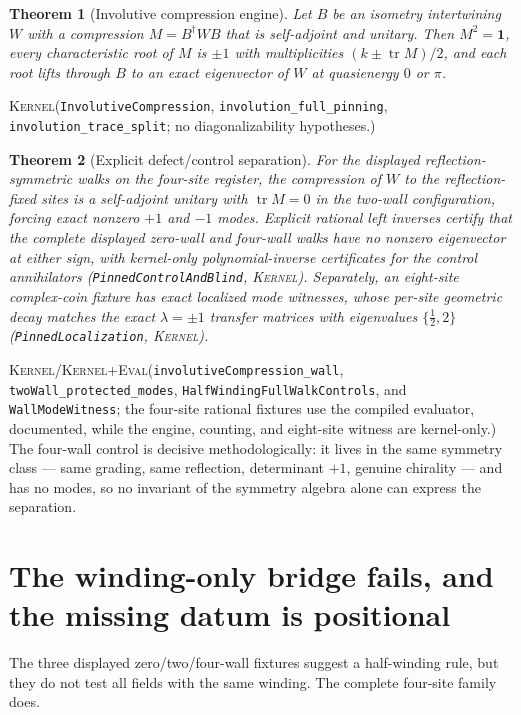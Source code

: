 \documentclass[11pt]{article}
\newcommand{\id}{\mathbf{1}}
\newcommand{\tr}{\operatorname{tr}}
\newcommand{\Kernel}{\textcolor{kernelcolor}{\textsc{Kernel}}}
\newcommand{\DraftTrust}{\textcolor{draftcolor}{\textsc{Kernel+Eval}}}
\newtheorem{theorem}{Theorem}
\begin{document}
\begin{theorem}[Involutive compression engine]\label{thm:engine}
Let $B$ be an isometry intertwining $W$ with a compression $M=B^\dagger WB$
that is self-adjoint and unitary.  Then $M^2=\id$, every characteristic
root of $M$ is $\pm1$ with multiplicities $(k\pm\tr M)/2$, and each root
lifts through $B$ to an exact eigenvector of $W$ at quasienergy $0$ or
$\pi$.
\end{theorem}
\noindent\Kernel{}\quad(\texttt{InvolutiveCompression},
\texttt{involution\_full\_pinning}, \texttt{involution\_trace\_split};
no diagonalizability hypotheses.)

\begin{theorem}[Explicit defect/control separation]\label{thm:halfwinding}
For the displayed reflection-symmetric walks on the four-site register, the
compression of $W$ to the reflection-fixed sites is a self-adjoint unitary
with $\tr M=0$ in the two-wall configuration, forcing exact nonzero $+1$
and $-1$ modes.  Explicit rational left inverses certify that the complete
displayed zero-wall and four-wall walks have no nonzero eigenvector at either
sign, with kernel-only polynomial-inverse certificates for the control
annihilators (\texttt{PinnedControlAndBlind}, \Kernel{}).  Separately, an
eight-site complex-coin fixture has exact localized
mode witnesses, whose per-site geometric decay matches the exact
$\lambda=\pm1$ transfer matrices with eigenvalues $\{\tfrac12,2\}$
(\texttt{PinnedLocalization}, \Kernel{}).
\end{theorem}
\noindent\Kernel{}/\DraftTrust{}\quad(\texttt{involutiveCompression\_wall},
\texttt{twoWall\_protected\_modes},
\texttt{HalfWindingFullWalkControls}, and \texttt{WallModeWitness}; the
four-site rational fixtures use the compiled evaluator, documented, while the
engine, counting, and eight-site witness are kernel-only.)  The four-wall control is decisive
methodologically: it lives in the same symmetry class --- same grading,
same reflection, determinant $+1$, genuine chirality --- and has no modes,
so no invariant of the symmetry algebra alone can express the separation.

\section{The winding-only bridge fails, and the missing datum is positional}

The three displayed zero/two/four-wall fixtures suggest a half-winding rule,
but they do not test all fields with the same winding.  The complete four-site
family does.
\end{document}
